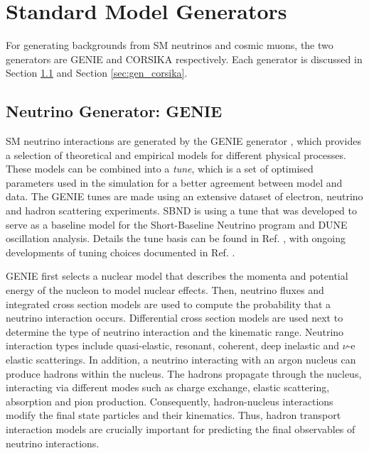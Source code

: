 \section{Standard Model Generators}
\label{sec:gen_sm}

For generating backgrounds from SM neutrinos and cosmic muons, the two generators are GENIE \cite{genie} and CORSIKA \cite{corsika} respectively.
Each generator is discussed in Section \ref{sec:gen_genie} and Section \ref{sec:gen_corsika}.

\subsection{Neutrino Generator: GENIE}
\label{sec:gen_genie}

SM neutrino interactions are generated by the GENIE generator \cite{genie}, which provides a selection of theoretical and empirical models for different physical processes.
These models can be combined into a \textit{tune}, which is a set of optimised parameters used in the simulation for a better agreement between model and data.
The GENIE tunes are made using an extensive dataset of electron, neutrino and hadron scattering experiments.
SBND is using a tune that was developed to serve as a baseline model for the Short-Baseline Neutrino program and DUNE oscillation analysis.
Details the tune basis can be found in Ref. \cite{genie_tune}, with ongoing developments of tuning choices documented in Ref. \cite{genie_tune_github}.  

GENIE first selects a nuclear model that describes the momenta and potential energy of the nucleon to model nuclear effects.
Then, neutrino fluxes and integrated cross section models are used to compute the probability that a neutrino interaction occurs.
Differential cross section models are used next to determine the type of neutrino interaction and the kinematic range.
Neutrino interaction types include quasi-elastic, resonant, coherent, deep inelastic and $\nu$-e elastic scatterings.
In addition, a neutrino interacting with an argon nucleus can produce hadrons within the nucleus.
The hadrons propagate through the nucleus, interacting via different modes such as charge exchange, elastic scattering, absorption and pion production.
Consequently, hadron-nucleus interactions modify the final state particles and their kinematics.
Thus, hadron transport interaction models are crucially important for predicting the final observables of neutrino interactions.

